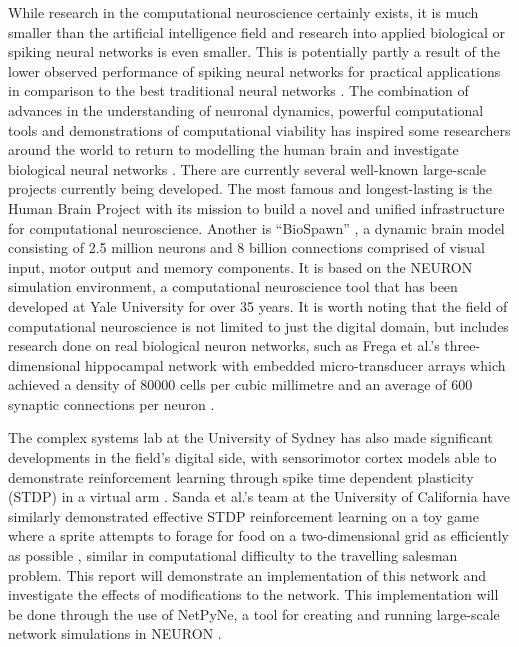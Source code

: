 \documentclass[11pt, twocolumn]{article}
\begin{document}
While research in the computational neuroscience certainly exists, it is much smaller than the artificial intelligence field and research into applied biological or spiking neural networks is even smaller. This is potentially partly a result of the lower observed performance of spiking neural networks for practical applications in comparison to the best traditional neural networks \cite{schmidhuber2015deep}. The combination of advances in the understanding of neuronal dynamics, powerful computational tools and demonstrations of computational viability \cite{zenke2014limits} has inspired some researchers around the world to return to modelling the human brain and investigate biological neural networks \cite{ashby2011tutorial}\cite{ashby2005frost}\cite{frank2005dynamic}\cite{hartley2006understanding}\cite{leveille2010running}. There are currently several well-known large-scale projects currently being developed. The most famous and longest-lasting is the Human Brain Project \cite{markram2015reconstruction} with its mission to build a novel and unified infrastructure for computational neuroscience. Another is ``BioSpawn'' \cite{eliasmith2016biospaun}, a dynamic brain model consisting of 2.5 million neurons and 8 billion connections comprised of visual input, motor output and memory components. It is based on the NEURON simulation environment, a computational neuroscience tool that has been developed at Yale University for over 35 years. It is worth noting that the field of computational neuroscience is not limited to just the digital domain, but includes research done on real biological neuron networks, such as Frega et al.'s three-dimensional hippocampal network with embedded micro-transducer arrays which achieved a density of 80000 cells per cubic millimetre and an average of 600 synaptic connections per neuron \cite{frega2014network}.

The complex systems lab at the University of Sydney has also made significant developments in the field's digital side, with sensorimotor cortex models able to demonstrate reinforcement learning through spike time dependent plasticity (\acs{STDP}) in a virtual arm \cite{neymotin2013reinforcement}\cite{dura2017evolutionary}. Sanda et al.'s team at the University of California have similarly demonstrated effective \acs{STDP} reinforcement learning on a toy game where a sprite attempts to forage for food on a two-dimensional grid as efficiently as possible \cite{sanda2017multi}, similar in computational difficulty to the travelling salesman problem. This report will demonstrate an implementation of this network and investigate the effects of modifications to the network. This implementation will be done through the use of NetPyNe, a tool for creating and running large-scale network simulations in NEURON \cite{dura2018netpyne}.


\newpage
\printbibliography{}
\end{document}

